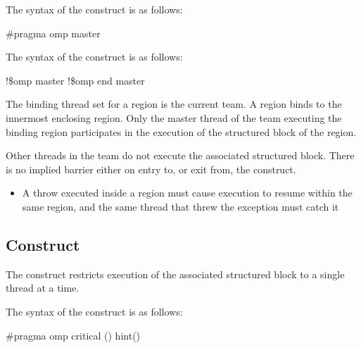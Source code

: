{{{{\syntax
\ccppspecificstart
The syntax of the  construct is as follows:

\begin{boxedcode}
\#pragma omp master 
\end{boxedcode}
\ccppspecificend

\fortranspecificstart
The syntax of the  construct is as follows:

\begin{boxedcode}
!\$omp master
!\$omp end master
\end{boxedcode}
\fortranspecificend

\binding
The binding thread set for a  region is the current team. A  region 
binds to the innermost enclosing  region. Only the master thread of the team 
executing the binding  region participates in the execution of the structured 
block of the  region.

\descr
Other threads in the team do not execute the associated structured block. There is no 
implied barrier either on entry to, or exit from, the  construct.

\restrictions
\cppspecificstart
\begin{itemize}
\item A throw executed inside a  region must cause execution to resume within the 
same  region, and the same thread that threw the exception must catch it
\end{itemize}
\cppspecificend











\subsection{ Construct}
\label{subsec:critical Construct}
\summary
The  construct restricts execution of the associated structured block to a 
single thread at a time.

\syntax
\ccppspecificstart
The syntax of the  construct is as follows:

\begin{boxedcode}
\#pragma omp critical \plc{[}() \plc{[}hint()\plc{] ] new-line}
\end{boxedcode}

}}}}
